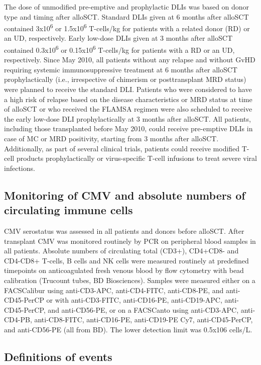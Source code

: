 \documentclass[
  letterpaper,
  DIV=11,
  numbers=noendperiod]{scrreprt}
\begin{document}
The dose of unmodified pre-emptive and prophylactic DLIs was based on
donor type and timing after alloSCT. Standard DLIs given at 6 months
after alloSCT contained 3x10\textsuperscript{6} or
1.5x10\textsuperscript{6} T-cells/kg for patients with a related donor
(RD) or an UD, respectively. Early low-dose DLIs given at 3 months after
alloSCT contained 0.3x10\textsuperscript{6} or
0.15x10\textsuperscript{6} T-cells/kg for patients with a RD or an UD,
respectively. Since May 2010, all patients without any relapse and
without GvHD requiring systemic immunosuppressive treatment at 6 months
after alloSCT prophylactically (i.e., irrespective of chimerism or
posttransplant MRD status) were planned to receive the standard DLI.
Patients who were considered to have a high risk of relapse based on the
disease characteristics or MRD status at time of alloSCT or who received
the FLAMSA regimen were also scheduled to receive the early low-dose DLI
prophylactically at 3 months after alloSCT. All patients, including
those transplanted before May 2010, could receive pre-emptive DLIs in
case of MC or MRD positivity, starting from 3 months after alloSCT.
Additionally, as part of several clinical trials, patients could receive
modified T-cell products prophylactically or virus-specific T-cell
infusions to treat severe viral infections.

\subsection{Monitoring of CMV and absolute numbers of circulating immune
cells}\label{monitoring-of-cmv-and-absolute-numbers-of-circulating-immune-cells}

CMV serostatus was assessed in all patients and donors before alloSCT.
After transplant CMV was monitored routinely by PCR on peripheral blood
samples in all patients. Absolute numbers of circulating total (CD3+),
CD4+CD8- and CD4-CD8+ T-cells, B cells and NK cells were measured
routinely at predefined timepoints on anticoagulated fresh venous blood
by flow cytometry with bead calibration (Trucount tubes, BD
Biosciences). Samples were measured either on a FACSCalibur using
anti-CD3-APC, anti-CD4-FITC, anti-CD8-PE, and anti-CD45-PerCP or with
anti-CD3-FITC, anti-CD16-PE, anti-CD19-APC, anti-CD45-PerCP, and
anti-CD56-PE, or on a FACSCanto using anti-CD3-APC, anti-CD4-PB,
anti-CD8-FITC, anti-CD16-PE, anti-CD19-PE Cy7, anti-CD45-PerCP, and
anti-CD56-PE (all from BD). The lower detection limit was 0.5x106
cells/L.

\subsection{Definitions of events}\label{definitions-of-events}
\end{document}

